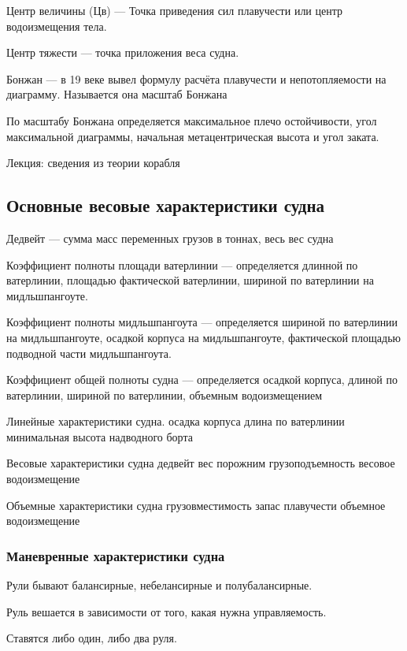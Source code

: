 \documentclass{article}        %
\begin{document}
\begin{description}
Центр величины (Цв) --- Точка приведения сил плавучести или центр водоизмещения тела.

Центр тяжести --- точка приложения веса судна.

Бонжан --- в 19 веке вывел формулу расчёта плавучести и непотопляемости на диаграмму.
	Называется она масштаб Бонжана

По масштабу Бонжана определяется максимальное плечо остойчивости, угол максимальной диаграммы, начальная метацентрическая высота и угол заката.

Лекция: сведения из теории корабля

\subsection{Основные весовые характеристики судна}
Дедвейт --- сумма масс переменных грузов в тоннах, весь вес судна

Коэффициент полноты площади ватерлинии --- определяется длинной по ватерлинии, площадью фактической ватерлинии, шириной по ватерлинии на мидльшпангоуте.

Коэффициент полноты мидльшпангоута --- определяется шириной по ватерлинии на мидльшпангоуте,
осадкой корпуса на мидльшпангоуте, фактической площадью подводной части мидльшпангоута. 

Коэффициент общей полноты судна --- определяется осадкой корпуса, длиной по ватерлинии, 
	шириной по ватерлинии, объемным водоизмещением

Линейные характеристики судна.
	осадка корпуса
	длина по ватерлинии
	минимальная высота надводного борта

Весовые характеристики судна
	дедвейт
	вес порожним
	грузоподъемность
	весовое водоизмещение

Объемные характеристики судна
	грузовместимость
	запас плавучести
	объемное водоизмещение

\subsubsection{Маневренные характеристики судна}
Рули бывают балансирные, небелансирные и полубалансирные.

Руль вешается в зависимости от того, какая нужна управляемость.

Ставятся либо один, либо два руля.



\end{description}
\end{document}
